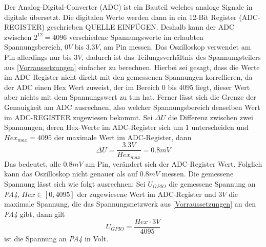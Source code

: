Der Analog-Digital-Converter (ADC) ist ein Bauteil welches analoge Signale in digitale übersetzt. \newline
Die digitalen Werte werden dann in ein 12-Bit Register (ADC-REGISTER) geschrieben QUELLE EINFÜGEN.
Deshalb kann der ADC zwischen $2^{12} = 4096$ verschiedene Spannungswerte im erlaubten Spannungsbereich, $0V$ bis $3.3V$, am Pin messen.
Das Oszilloskop verwendet am Pin allerdings nur bis $3V$, dadurch ist das Teilungsverhältnis des Spannungsteilers aus \ref{Vorraussetzungen} einfacher zu berechnen. \newline
Hierbei sei gesagt, dass die Werte im ADC-Register nicht direkt mit den gemessenen Spannungen korrellieren,
da der ADC einen Hex Wert zuweist, der im Bereich $0$ bis $4095$ liegt, dieser Wert aber nichts mit
dem Spannungswert zu tun hat. \newline
Ferner lässt sich die Grenze der Genauigkeit am ADC ausrechnen, also welcher Spannungsbereich denselben
Wert im ADC-REGISTER zugewiesen bekommt.
Sei $\Delta U$ die Differenz zwischen zwei Spannungen, deren Hex-Werte im ADC-Register sich um $1$ unterscheiden und $Hex_{max} = 4095$ der maximale Wert im ADC-Register,
dann
$$\Delta U = \frac{3.3V}{Hex_{max}} = 0.8mV$$
Das bedeutet, alle $0.8mV$ am Pin, verändert sich der ADC-Register Wert. \newline
Folglich kann das Oszilloskop nicht genauer als auf $0.8mV$ messen. \newline
Die gemessene Spannung lässt sich wie folgt ausrechnen: \newline
Sei $U_{GPIO}$ die gemessene Spannung an \textit{PA4}, $Hex \in [0, 4095]$ der zugewiesene Wert im ADC-Register
und $3V$ die maximale Spannung, die das Spannungsnetzwerk aus \ref{Vorraussetzungen} an den \textit{PA4} gibt,
dann gilt
$$
	U_{GPIO} = \frac{Hex \cdot 3V}{4095}
$$
ist die Spannung an \textit{PA4} in Volt.

